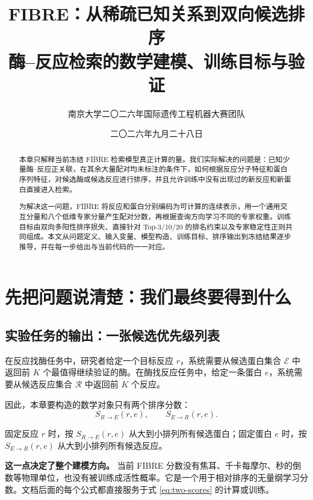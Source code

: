\documentclass[UTF8,11pt,a4paper]{ctexart}
\title{\vspace{-0.9cm}\Huge\bfseries FIBRE：从稀疏已知关系到双向候选排序\\[0.42em]
\Large 酶--反应检索的数学建模、训练目标与验证}
\author{南京大学二〇二六年国际遗传工程机器大赛团队}
\date{二〇二六年九月二十八日}
\newcommand{\Rset}{\mathcal R}
\newcommand{\Eset}{\mathcal E}
\begin{document}
\maketitle

\begin{abstract}
本章只解释当前冻结 FIBRE 检索模型真正计算的量。我们实际解决的问题是：已知少量酶--反应正关联，在其余大量配对均未标注的条件下，如何根据反应分子特征和蛋白序列特征，对候选酶或候选反应进行排序，并且允许训练中没有出现过的新反应和新蛋白直接进入检索。

为解决这一问题，FIBRE 将反应和蛋白分别编码为可计算的连续表示，用一个通用交互分量和八个低维专家分量产生配对分数，再根据查询方向学习不同的专家权重。训练目标由双向多阳性排序损失、直接针对 Top-3/10/20 的排名约束以及专家稳定性正则共同组成。本文从问题定义、输入变量、模型构造、训练目标、排序输出到冻结结果逐步推导，并在每一步给出与当前代码的一一对应。
\end{abstract}

\tableofcontents

\section{先把问题说清楚：我们最终要得到什么}

\subsection{实验任务的输出：一张候选优先级列表}

在反应找酶任务中，研究者给定一个目标反应 $r$，系统需要从候选蛋白集合 $\Eset$ 中返回前 $K$ 个最值得继续验证的酶。在酶找反应任务中，给定一条蛋白 $e$，系统需要从候选反应集合 $\Rset$ 中返回前 $K$ 个反应。

因此，本章要构造的数学对象只有两个排序分数：
\begin{equation}
S_{R\rightarrow E}(r,e),
\qquad
S_{E\rightarrow R}(r,e).
\label{eq:two-scores}
\end{equation}

固定反应 $r$ 时，按 $S_{R\rightarrow E}(r,e)$ 从大到小排列所有候选蛋白；固定蛋白 $e$ 时，按 $S_{E\rightarrow R}(r,e)$ 从大到小排列所有候选反应。

\begin{keybox}
\textbf{这一点决定了整个建模方向。} 当前 FIBRE 分数没有焦耳、千卡每摩尔、秒的倒数等物理单位，也没有被训练成活性概率。它是一个用于相对排序的无量纲学习分数。文档后面的每个公式都直接服务于式 \eqref{eq:two-scores} 的计算或训练。
\end{keybox}
\end{document}
